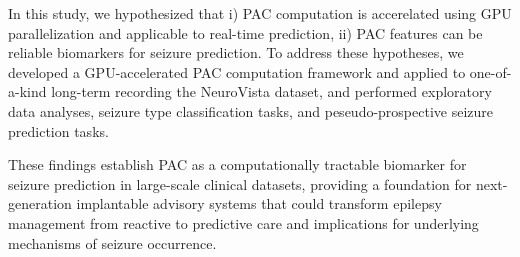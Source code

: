 In this study, we hypothesized that i) PAC computation is accerelated using GPU parallelization and applicable to real-time prediction, ii) PAC features can be reliable biomarkers for seizure prediction. To address these hypotheses, we developed a GPU-accelerated PAC computation framework and applied to one-of-a-kind long-term recording the NeuroVista dataset, and performed exploratory data analyses, seizure type classification tasks, and peseudo-prospective seizure prediction tasks.

These findings establish PAC as a computationally tractable biomarker for seizure prediction in large-scale clinical datasets, providing a foundation for next-generation implantable advisory systems that could transform epilepsy management from reactive to predictive care and implications for underlying mechanisms of seizure occurrence.

\label{sec:introduction}

